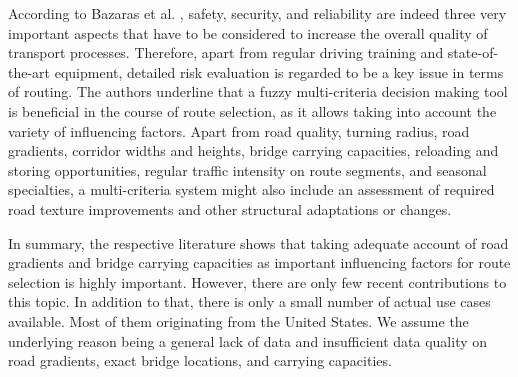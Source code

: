 \par
According to Bazaras et al. \cite{Bazaras.2013}, safety, security, and reliability are indeed three very important aspects that have to be considered to increase the overall quality of transport processes. Therefore, apart from regular driving training and state-of-the-art equipment, detailed risk evaluation is regarded to be a key issue in terms of \ohc routing. The authors underline that a fuzzy multi-criteria decision making tool is beneficial in the course of route selection, as it allows taking into account the variety of influencing factors. Apart from road quality, turning radius, road gradients, corridor widths and heights, bridge carrying capacities, reloading and storing opportunities, regular traffic intensity on route segments, and seasonal specialties, a multi-criteria system might also include an assessment of required road texture improvements and other structural adaptations or changes.
\par
In summary, the respective literature shows that taking adequate account of road gradients and bridge carrying capacities as important influencing factors for \ohc route selection is highly important. However, there are only few recent contributions to this topic. In addition to that, there is only a small number of actual use cases available. Most of them originating from the United States. We assume the underlying reason being a general lack of data and insufficient data quality on road gradients, exact bridge locations, and carrying capacities.



%
%
%
%
